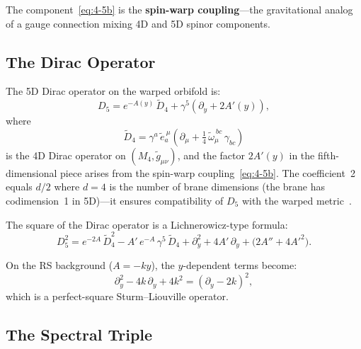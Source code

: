The component~\eqref{eq:4-5b} is the \textbf{spin-warp coupling}---the gravitational analog of a gauge connection mixing 4D and 5D spinor components.


\subsection{The Dirac Operator}
\label{sec:4-dirac}

The 5D Dirac operator on the warped orbifold is:
\begin{equation}
  D_5 = e^{-A(y)}\, \widetilde{D}_4 + \gamma^5\!\left(\partial_y + 2A'(y)\right),
  \label{eq:4-6}
\end{equation}
where
\begin{equation}
  \widetilde{D}_4 = \gamma^a\, \tilde{e}_a^{\ \mu}\!\left(\partial_\mu + \tfrac{1}{4}\, \tilde{\omega}_\mu^{\ bc}\, \gamma_{bc}\right)
  \label{eq:4-7}
\end{equation}
is the 4D Dirac operator on $(M_4, \tilde{g}_{\mu\nu})$, and the factor $2A'(y)$ in the fifth-dimensional piece arises from the spin-warp coupling~\eqref{eq:4-5b}. The coefficient~2 equals $d/2$ where $d = 4$ is the number of brane dimensions (the brane has codimension~1 in 5D)---it ensures compatibility of $D_5$ with the warped metric~\cite{ch4:GrossmanNeubert2000}.

The square of the Dirac operator is a Lichnerowicz-type formula:
\begin{equation}
  D_5^2 = e^{-2A}\, \widetilde{D}_4^2 - A'\, e^{-A}\, \gamma^5\, \widetilde{D}_4
         + \partial_y^2 + 4A'\, \partial_y + \bigl(2A'' + 4A'^2\bigr).
  \label{eq:4-8}
\end{equation}

On the RS background ($A = -ky$), the $y$-dependent terms become:
\begin{equation}
  \partial_y^2 - 4k\, \partial_y + 4k^2
  = (\partial_y - 2k)^2,
  \label{eq:4-9}
\end{equation}
which is a perfect-square Sturm--Liouville operator.


\subsection{The Spectral Triple}
\label{sec:4-triple}

